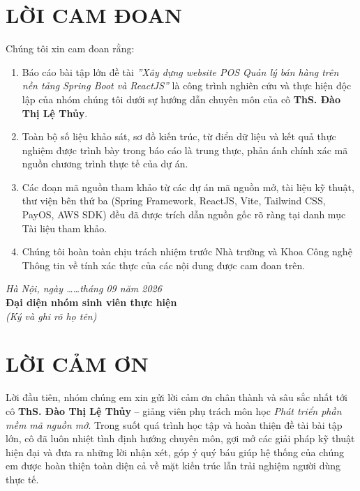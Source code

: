 \cleardoublepage
\chapter*{LỜI CAM ĐOAN}

Chúng tôi xin cam đoan rằng:
\begin{enumerate}[label=\arabic*.]
    \item Báo cáo bài tập lớn đề tài \textit{''Xây dựng website POS Quản lý bán hàng trên nền tảng Spring Boot và ReactJS''} là công trình nghiên cứu và thực hiện độc lập của nhóm chúng tôi dưới sự hướng dẫn chuyên môn của cô \textbf{ThS. Đào Thị Lệ Thủy}.
    \item Toàn bộ số liệu khảo sát, sơ đồ kiến trúc, từ điển dữ liệu và kết quả thực nghiệm được trình bày trong báo cáo là trung thực, phản ánh chính xác mã nguồn chương trình thực tế của dự án.
    \item Các đoạn mã nguồn tham khảo từ các dự án mã nguồn mở, tài liệu kỹ thuật, thư viện bên thứ ba (Spring Framework, ReactJS, Vite, Tailwind CSS, PayOS, AWS SDK) đều đã được trích dẫn nguồn gốc rõ ràng tại danh mục Tài liệu tham khảo.
    \item Chúng tôi hoàn toàn chịu trách nhiệm trước Nhà trường và Khoa Công nghệ Thông tin về tính xác thực của các nội dung được cam đoan trên.
\end{enumerate}

\vspace{15mm}
\begin{flushright}
    \textit{Hà Nội, ngày \dots\dots tháng 09 năm 2026}\\[3mm]
    \textbf{Đại diện nhóm sinh viên thực hiện}\\[15mm]
    \textit{(Ký và ghi rõ họ tên)}
\end{flushright}

\cleardoublepage
\chapter*{LỜI CẢM ƠN}

Lời đầu tiên, nhóm chúng em xin gửi lời cảm ơn chân thành và sâu sắc nhất tới cô \textbf{ThS. Đào Thị Lệ Thủy} – giảng viên phụ trách môn học \textit{Phát triển phần mềm mã nguồn mở}. Trong suốt quá trình học tập và hoàn thiện đề tài bài tập lớn, cô đã luôn nhiệt tình định hướng chuyên môn, gợi mở các giải pháp kỹ thuật hiện đại và đưa ra những lời nhận xét, góp ý quý báu giúp hệ thống của chúng em được hoàn thiện toàn diện cả về mặt kiến trúc lẫn trải nghiệm người dùng thực tế.

